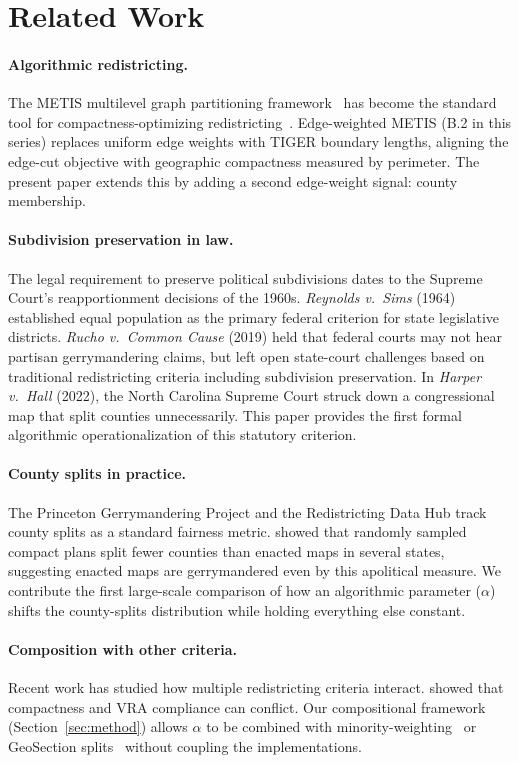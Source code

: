 \section{Related Work}
\label{sec:related}

\paragraph{Algorithmic redistricting.}
The METIS multilevel graph partitioning framework~\citep{Karypis1998} has become
the standard tool for compactness-optimizing redistricting~\citep{Browdy1990,
Liu2016}.
Edge-weighted METIS (B.2 in this series) replaces uniform edge weights with
TIGER boundary lengths, aligning the edge-cut objective with geographic compactness
measured by perimeter.
The present paper extends this by adding a second edge-weight signal: county
membership.

\paragraph{Subdivision preservation in law.}
The legal requirement to preserve political subdivisions dates to the
Supreme Court's reapportionment decisions of the 1960s.
\emph{Reynolds v.\ Sims} (1964) established equal population as the primary
federal criterion for state legislative districts.
\emph{Rucho v.\ Common Cause} (2019) held that federal courts may not hear
partisan gerrymandering claims, but left open state-court challenges based on
traditional redistricting criteria including subdivision preservation.
In \emph{Harper v.\ Hall} (2022), the North Carolina Supreme Court struck down
a congressional map that split counties unnecessarily.
This paper provides the first formal algorithmic operationalization of this
statutory criterion.

\paragraph{County splits in practice.}
The Princeton Gerrymandering Project and the Redistricting Data Hub track county
splits as a standard fairness metric.
\citet{Chen2013} showed that randomly sampled compact plans split fewer counties
than enacted maps in several states, suggesting enacted maps are gerrymandered
even by this apolitical measure.
We contribute the first large-scale comparison of how an algorithmic parameter
($\alpha$) shifts the county-splits distribution while holding everything else
constant.

\paragraph{Composition with other criteria.}
Recent work has studied how multiple redistricting criteria interact.
\citet{Duchin2020} showed that compactness and VRA compliance can conflict.
Our compositional framework (Section~\ref{sec:method}) allows $\alpha$ to be
combined with minority-weighting~\citep[B.2]{DL2026b} or GeoSection
splits~\citep[T.1]{DL2026c} without coupling the implementations.
